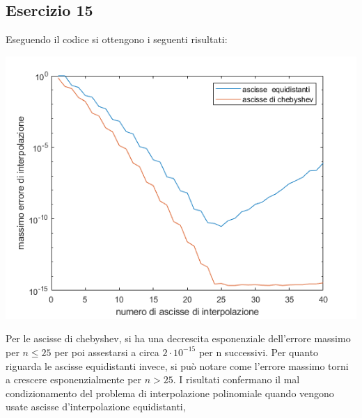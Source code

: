 \subsection{Esercizio 15}
Eseguendo il codice  si ottengono i seguenti risultati:

    
\includegraphics[scale=0.8]{capitolo4/interpol.png}

Per le ascisse di chebyshev, si ha una decrescita esponenziale dell'errore massimo per $ n \le 25$ per poi assestarsi a circa $2\cdot10^{-15}$ per n successivi.
Per quanto riguarda le ascisse equidistanti invece, si può notare come l'errore massimo torni  a crescere esponenzialmente per $n >25$. I risultati confermano
il mal condizionamento del problema di interpolazione polinomiale quando vengono usate ascisse d'interpolazione equidistanti,